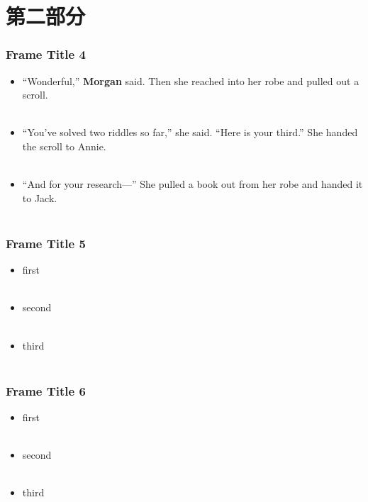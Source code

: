 \documentclass{beamer}
\begin{document}
	\section{第二部分}
	\begin{frame}
		\frametitle{Frame Title 4}
		\begin{itemize} 
			\item “Wonderful,” \textbf {Morgan} said. Then she reached into her robe and pulled out a scroll. \\~\\
			\item “You’ve solved two riddles so far,” she said. “Here is your third.” She handed the scroll to Annie. \\~\\
			\item  “And for your research—” She pulled a book out from her robe and handed it to Jack. \\~\\
		\end{itemize}
	\end{frame}
	\begin{frame}
		\frametitle{Frame Title 5}
		\begin{itemize} 
			\item first \\~\\
			\item second \\~\\
			\item third \\~\\
		\end{itemize}
	\end{frame}
	\begin{frame}
		\frametitle{Frame Title 6}
		\begin{itemize} 
			\item first \\~\\
			\item second \\~\\
			\item third \\~\\
		\end{itemize}
	\end{frame}
\end{document}
